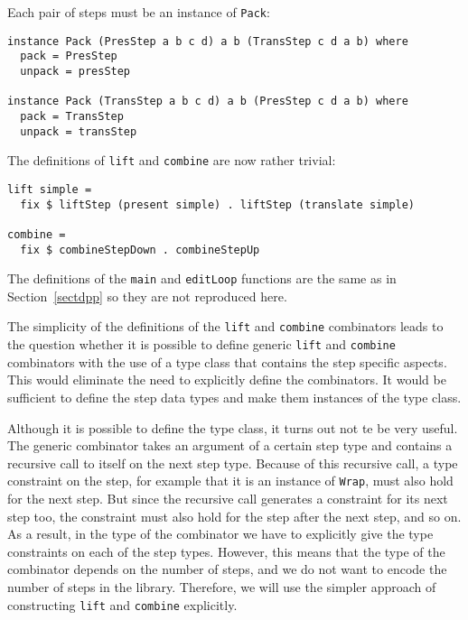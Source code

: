 Each pair of steps must be an instance of \texttt{Pack}: 

\begin{small}
\begin{verbatim}
instance Pack (PresStep a b c d) a b (TransStep c d a b) where
  pack = PresStep
  unpack = presStep

instance Pack (TransStep a b c d) a b (PresStep c d a b) where
  pack = TransStep
  unpack = transStep
\end{verbatim}
\end{small}

The definitions of \texttt{lift} and \texttt{combine} are now rather trivial:

\begin{small}
\begin{verbatim}
lift simple =
  fix $ liftStep (present simple) . liftStep (translate simple)

combine = 
  fix $ combineStepDown . combineStepUp
\end{verbatim}
\end{small}

The definitions of the \texttt{main} and \texttt{editLoop} functions are the same as in Section~\ref{sectdpp} so they are not reproduced here.



The simplicity of the definitions of the \texttt{lift} and \texttt{combine} combinators leads to the question whether it is possible to define generic \texttt{lift} and \texttt{combine} combinators with the use of a type class that contains the step specific aspects. This would eliminate the need to explicitly define the combinators. It would be sufficient to define the step data types and make them instances of the type class. 

Although it is possible to define the type class, it turns out not te be very useful. The generic combinator takes an argument of a certain step type and contains a recursive call to itself on the next step type. Because of this recursive call, a type constraint on the step, for example that it is an instance of \texttt{Wrap}, must also hold for the next step. But since the recursive call generates a constraint for its next step too, the constraint must also hold for the step after the next step, and so on. As a result, in the type of the combinator we have to explicitly give the type constraints on each of the step types. However, this means that the type of the combinator depends on the number of steps, and we do not want to encode the number of steps in the library. Therefore, we will use the simpler approach of constructing \texttt{lift} and \texttt{combine} explicitly.

